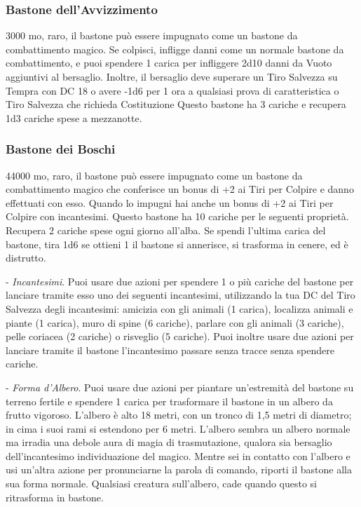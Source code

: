 \begin{multicols}{2}
\subsubsection*{Bastone dell'Avvizzimento}
3000 mo, raro, il bastone può essere impugnato come un bastone da combattimento magico. Se colpisci, infligge danni come un normale bastone da combattimento, e puoi spendere 1 carica per infliggere 2d10 danni da Vuoto aggiuntivi al bersaglio. Inoltre, il bersaglio deve superare un Tiro Salvezza su Tempra con DC 18 o avere -1d6 per 1 ora a qualsiasi prova di caratteristica o Tiro Salvezza che richieda Costituzione Questo bastone ha 3 cariche e recupera 1d3 cariche spese a mezzanotte.

\subsubsection*{Bastone dei Boschi}
44000 mo, raro, il bastone può essere impugnato come un bastone da combattimento magico che conferisce un bonus di +2 ai Tiri per Colpire e danno effettuati con esso. Quando lo impugni hai anche un bonus di +2 ai Tiri per Colpire con incantesimi.
Questo bastone ha 10 cariche per le seguenti proprietà. Recupera 2 cariche spese ogni giorno all'alba. Se spendi l'ultima carica del bastone, tira 1d6 se ottieni 1 il bastone si annerisce, si trasforma in cenere, ed è distrutto.

- \textit{Incantesimi}. Puoi usare due azioni per spendere 1 o più cariche del bastone per lanciare tramite esso uno dei seguenti incantesimi, utilizzando la tua DC del Tiro Salvezza degli incantesimi: amicizia con gli animali (1 carica), localizza animali e piante (1 carica), muro di spine (6 cariche), parlare con gli animali (3 cariche), pelle coriacea (2 cariche) o risveglio (5 cariche). Puoi inoltre usare due azioni per lanciare tramite il bastone l'incantesimo passare senza tracce senza
spendere cariche.

- \textit{Forma d'Albero}. Puoi usare due azioni per piantare un'estremità del bastone su terreno fertile e spendere 1 carica per trasformare il bastone in un albero da frutto vigoroso. L'albero è alto 18 metri, con un tronco di 1,5 metri di diametro; in cima i suoi rami si estendono per 6 metri. L'albero sembra un albero normale ma irradia una debole aura di magia di trasmutazione, qualora sia bersaglio dell'incantesimo individuazione del magico. Mentre sei in contatto con l'albero e usi un'altra azione per pronunciarne la parola di comando, riporti il bastone alla sua forma normale. Qualsiasi creatura sull'albero, cade quando questo si ritrasforma in bastone.


\end{multicols}
